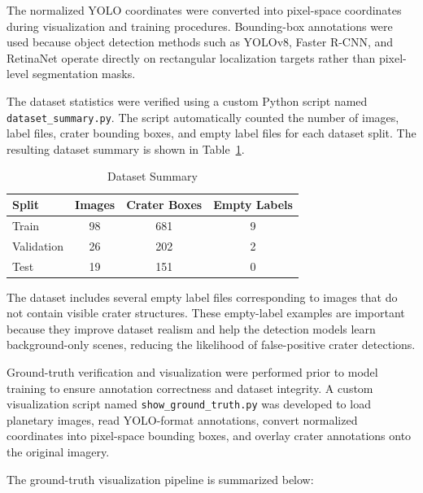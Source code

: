 \documentclass[conference]{IEEEtran}
\begin{document}
	The normalized YOLO coordinates were converted into pixel-space coordinates during visualization and training procedures. Bounding-box annotations were used because object detection methods such as YOLOv8, Faster R-CNN, and RetinaNet operate directly on rectangular localization targets rather than pixel-level segmentation masks.
	
	The dataset statistics were verified using a custom Python script named \texttt{dataset\_summary.py}. The script automatically counted the number of images, label files, crater bounding boxes, and empty label files for each dataset split. The resulting dataset summary is shown in Table~\ref{tab:dataset_summary}.
	
	\begin{table}[h]
		\centering
		\caption{Dataset Summary}
		\label{tab:dataset_summary}
		\begin{tabular}{lccc}
			\toprule
			Split & Images & Crater Boxes & Empty Labels \\
			\midrule
			Train & 98 & 681 & 9 \\
			Validation & 26 & 202 & 2 \\
			Test & 19 & 151 & 0 \\
			\bottomrule
		\end{tabular}
	\end{table}
	
	The dataset includes several empty label files corresponding to images that do not contain visible crater structures. These empty-label examples are important because they improve dataset realism and help the detection models learn background-only scenes, reducing the likelihood of false-positive crater detections.
	
	Ground-truth verification and visualization were performed prior to model training to ensure annotation correctness and dataset integrity. A custom visualization script named \texttt{show\_ground\_truth.py} was developed to load planetary images, read YOLO-format annotations, convert normalized coordinates into pixel-space bounding boxes, and overlay crater annotations onto the original imagery.
	
	The ground-truth visualization pipeline is summarized below:
	
\end{document}
